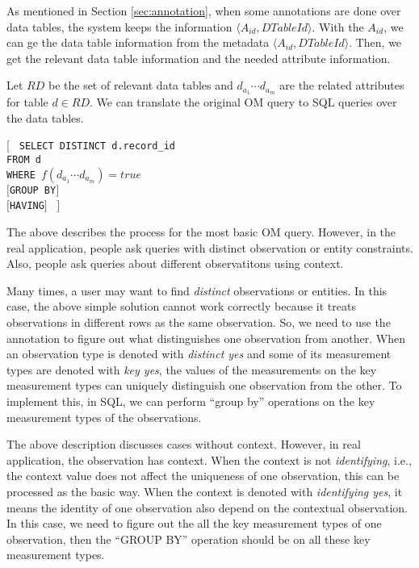\documentclass[conference]{IEEEtran}
\begin{document}
As mentioned in Section \ref{sec:annotation}, when some annotations are done over data tables, the system keeps the
information $\langle A_{id}, DTableId\rangle$. 
With the $A_{id}$, we can ge the data table information from the
metadata  $\langle A_{id}, DTableId\rangle$. 
Then, we get the relevant data table information and the needed attribute
information.

Let $RD$ be the set of relevant data tables and $d_{a_1} \cdots d_{a_m}$
are the related attributes for table $d\in RD$. We can translate the original OM query to SQL queries
over the data tables.  

[
{\tt 
SELECT DISTINCT d.record\_id\\
FROM d\\
WHERE $f(d_{a_1} \cdots d_{a_m}) = true$\\
$[$GROUP BY$]$\\
$[$HAVING$]$
}
]

The above describes the process for the most basic OM query. 
However, in the real application, people ask queries with distinct
observation or entity constraints. Also, people ask queries about
different observatitons using context. 

Many times, a user may want to find {\em distinct} observations or
entities. In this case, the above simple solution cannot work
correctly because it treats observations in different rows as the same
observation. So, we need to use the annotation to figure out what
distinguishes one observation from another. 
When an observation type is denoted with {\em distinct yes} and some
of its measurement types are denoted with {\em key yes}, 
the values of the measurements on the key measurement types can
uniquely distinguish one observation from the other. 
To implement this, in SQL, we can perform ``group by'' operations on
the key measurement types of the observations. 

The above description discusses cases without context. 
However, in real application, the observation has context. 
When the context is not {\em identifying}, i.e., the context value
does not affect the uniqueness of one observation, this can be
processed as the basic way. 
When the context is denoted with {\em identifying yes}, it means the
identity of one observation also depend on the contextual
observation. 
In this case, we need to figure out the all the key measurement types
of one observation, then the ``GROUP BY'' operation should be on all
these key measurement types. 
\end{document}
